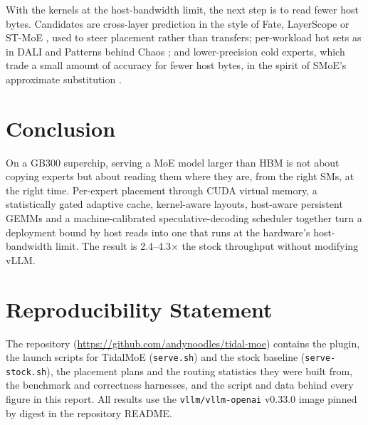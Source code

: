 \documentclass{article}
\newcommand{\repo}{\url{https://github.com/andynoodles/tidal-moe}}
\begin{document}
With the kernels at the host-bandwidth limit, the next step is to read fewer host bytes. Candidates are cross-layer
prediction in the style of Fate, LayerScope or ST-MoE \citep{fate,layerscope,stmoe}, used to steer placement rather
than transfers; per-workload hot sets as in DALI and Patterns behind Chaos \citep{dali,patternschaos}; and
lower-precision cold experts, which trade a small amount of accuracy for fewer host bytes, in the spirit of SMoE's
approximate substitution \citep{smoe}.

\section{Conclusion}
On a GB300 superchip, serving a MoE model larger than HBM is not about copying experts but about reading them where they
are, from the right SMs, at the right time. Per-expert placement through CUDA virtual memory, a statistically gated
adaptive cache, kernel-aware layouts, host-aware persistent GEMMs and a machine-calibrated speculative-decoding scheduler
together turn a deployment bound by host reads into one that runs at the hardware's host-bandwidth limit. The result is
2.4--4.3$\times$ the stock throughput without modifying vLLM.

\section*{Reproducibility Statement}
The repository (\repo) contains the plugin, the launch scripts for TidalMoE (\texttt{serve.sh}) and the stock baseline
(\texttt{serve-stock.sh}), the placement plans and the routing statistics they were built from, the benchmark and
correctness harnesses, and the script and data behind every figure in this report. All results use the
\texttt{vllm/vllm-openai} v0.33.0 image pinned by digest in the repository README.

\begingroup
\raggedright


\endgroup
\end{document}
